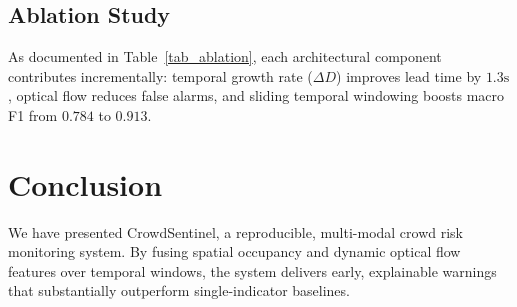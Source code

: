 \documentclass[conference]{IEEEtran}
\begin{document}
\subsection{Ablation Study}
As documented in Table~\ref{tab_ablation}, each architectural component contributes incrementally: temporal growth rate ($\Delta D$) improves lead time by $1.3\text{s}$, optical flow reduces false alarms, and sliding temporal windowing boosts macro F1 from $0.784$ to $0.913$.

\section{Conclusion}
We have presented CrowdSentinel, a reproducible, multi-modal crowd risk monitoring system. By fusing spatial occupancy and dynamic optical flow features over temporal windows, the system delivers early, explainable warnings that substantially outperform single-indicator baselines.



\end{document}
